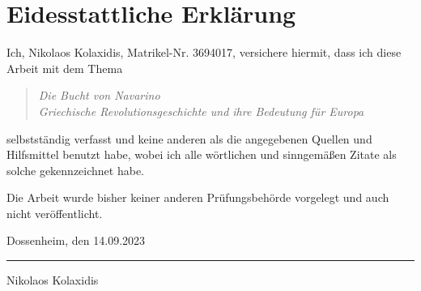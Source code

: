 \documentclass[preprint]{geomorphica} %
\begin{document}

\newpage
\section*{Eidesstattliche Erklärung}

Ich, Nikolaos Kolaxidis, Matrikel-Nr. 3694017, versichere hiermit, dass ich diese Arbeit mit dem Thema
\begin{quote}
\textit{Die Bucht von Navarino} \\ \textit{Griechische Revolutionsgeschichte und ihre Bedeutung für Europa}
\end{quote}
selbstständig verfasst und keine anderen als die angegebenen Quellen und Hilfsmittel benutzt habe, wobei ich alle wörtlichen und sinngemäßen Zitate als solche gekennzeichnet habe.

Die Arbeit wurde bisher keiner anderen Prüfungsbehörde vorgelegt und auch nicht veröffentlicht.

\vspace{10mm}

Dossenheim, den 14.09.2023 \\

\vspace{5mm}

\rule[-0.2cm]{5cm}{0.5pt}

Nikolaos Kolaxidis
\end{document}
